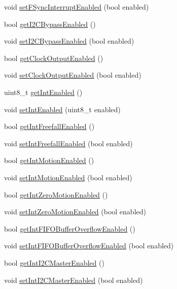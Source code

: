 \begin{DoxyCompactItemize}
void \hyperlink{class_m_p_u6050_a96aa409e02cdb7d3671890c70b44f167}{set\+F\+Sync\+Interrupt\+Enabled} (bool enabled)
\item 
bool \hyperlink{class_m_p_u6050_aed33db318a770d0020eb8b84058650f3}{get\+I2\+C\+Bypass\+Enabled} ()
\item 
void \hyperlink{class_m_p_u6050_aa828160756a50f414aa3f5f5f0353c70}{set\+I2\+C\+Bypass\+Enabled} (bool enabled)
\item 
bool \hyperlink{class_m_p_u6050_ada96c33957bf20c04ca598a3537358ef}{get\+Clock\+Output\+Enabled} ()
\item 
void \hyperlink{class_m_p_u6050_a71ec4642b6f6c937bbf6a24fea4179e5}{set\+Clock\+Output\+Enabled} (bool enabled)
\item 
uint8\+\_\+t \hyperlink{class_m_p_u6050_a295c9600579557df065aff88bc7a1d83}{get\+Int\+Enabled} ()
\item 
void \hyperlink{class_m_p_u6050_ac7bcf24249dd5000320a8ec0ffe488c6}{set\+Int\+Enabled} (uint8\+\_\+t enabled)
\item 
bool \hyperlink{class_m_p_u6050_a500bb2df2e46eaecd3fb2ba7304a5ed3}{get\+Int\+Freefall\+Enabled} ()
\item 
void \hyperlink{class_m_p_u6050_a01a24a05f06463d5277e1670d6260e03}{set\+Int\+Freefall\+Enabled} (bool enabled)
\item 
bool \hyperlink{class_m_p_u6050_a7de31a8e9f22765329d9f9e02db2f1f0}{get\+Int\+Motion\+Enabled} ()
\item 
void \hyperlink{class_m_p_u6050_a2d2d1d3b03198a09c83a48ec3bc20bd8}{set\+Int\+Motion\+Enabled} (bool enabled)
\item 
bool \hyperlink{class_m_p_u6050_ab3cc9bcaca6cec61e7f3f0c6c8a37db5}{get\+Int\+Zero\+Motion\+Enabled} ()
\item 
void \hyperlink{class_m_p_u6050_a5e36e3acace6e545718d7997169cff9b}{set\+Int\+Zero\+Motion\+Enabled} (bool enabled)
\item 
bool \hyperlink{class_m_p_u6050_a55f99c88cc84901f245924ed5e3fe47e}{get\+Int\+F\+I\+F\+O\+Buffer\+Overflow\+Enabled} ()
\item 
void \hyperlink{class_m_p_u6050_a83710a6b1e07f3b385239cc06f275cdb}{set\+Int\+F\+I\+F\+O\+Buffer\+Overflow\+Enabled} (bool enabled)
\item 
bool \hyperlink{class_m_p_u6050_a282ae29e029d88604a59c92bdf9ce252}{get\+Int\+I2\+C\+Master\+Enabled} ()
\item 
void \hyperlink{class_m_p_u6050_af238656844a3727fa96a8d434b55473e}{set\+Int\+I2\+C\+Master\+Enabled} (bool enabled)
\item 

\end{DoxyCompactItemize}
